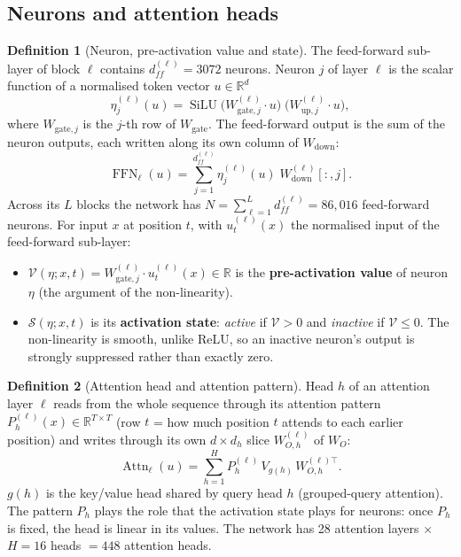 \documentclass[10pt,a4paper]{article}
\newcommand{\op}[1]{\operatorname{#1}}
\theoremstyle{definition}
\newtheorem{definition}{Definition}[section]
\begin{document}
\subsection{Neurons and attention heads}
\begin{definition}[Neuron, pre-activation value and state]
The feed-forward sub-layer of block $\ell$ contains $d_{ff}^{(\ell)}=3072$ neurons. Neuron $j$ of layer $\ell$ is the scalar function of a normalised token vector $u\in\mathbb{R}^{d}$
\begin{equation}
  \eta^{(\ell)}_j(u) = \op{SiLU}\big(W^{(\ell)}_{\mathrm{gate},j}\cdot u\big)\;\big(W^{(\ell)}_{\mathrm{up},j}\cdot u\big),
\end{equation}
where $W_{\mathrm{gate},j}$ is the $j$-th row of $W_{\mathrm{gate}}$. The feed-forward output is the sum of the neuron outputs, each written along its own column of $W_{\mathrm{down}}$:
\begin{equation}
  \op{FFN}_\ell(u) = \sum_{j=1}^{d_{ff}^{(\ell)}} \eta^{(\ell)}_j(u)\;W^{(\ell)}_{\mathrm{down}}[:,j].
\end{equation}
Across its $L$ blocks the network has $N=\sum_{\ell=1}^{L} d_{ff}^{(\ell)}=86{,}016$ feed-forward neurons. For input $x$ at position $t$, with $u^{(\ell)}_t(x)$ the normalised input of the feed-forward sub-layer:
\begin{itemize}
\item $\mathcal{V}(\eta;x,t)=W^{(\ell)}_{\mathrm{gate},j}\cdot u^{(\ell)}_t(x)\in\mathbb{R}$ is the \textbf{pre-activation value} of neuron $\eta$ (the argument of the non-linearity).
\item $\mathcal{S}(\eta;x,t)$ is its \textbf{activation state}: \emph{active} if $\mathcal{V}>0$ and \emph{inactive} if $\mathcal{V}\le 0$. The non-linearity is smooth, unlike ReLU, so an inactive neuron's output is strongly suppressed rather than exactly zero.
\end{itemize}
\end{definition}
\begin{definition}[Attention head and attention pattern]
Head $h$ of an attention layer $\ell$ reads from the whole sequence through its attention pattern $P^{(\ell)}_h(x)\in\mathbb{R}^{T\times T}$ (row $t$ = how much position $t$ attends to each earlier position) and writes through its own $d\times d_h$ slice $W^{(\ell)}_{O,h}$ of $W_O$:
\begin{equation}
  \op{Attn}_\ell(u) = \sum_{h=1}^{H} P^{(\ell)}_h\,V_{g(h)}\,W^{(\ell)\top}_{O,h}.
\end{equation}
$g(h)$ is the key/value head shared by query head $h$ (grouped-query attention). The pattern $P_h$ plays the role that the activation state plays for neurons: once $P_h$ is fixed, the head is linear in its values. The network has 28 attention layers $\times$ $H=16$ heads $=448$ attention heads.
\end{definition}
\end{document}
